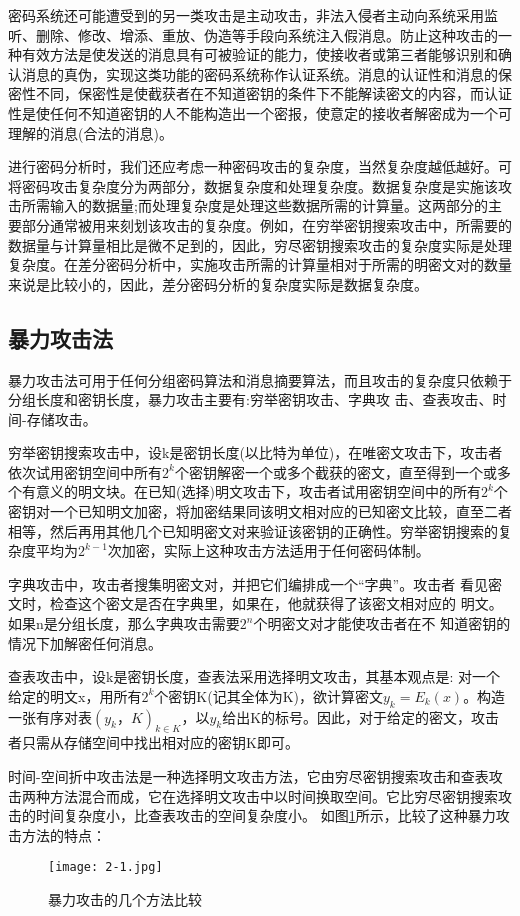 密码系统还可能遭受到的另一类攻击是主动攻击，非法入侵者主动向系统采用监听、删除、修改、增添、重放、伪造等手段向系统注入假消息。防止这种攻击的一种有效方法是使发送的消息具有可被验证的能力，使接收者或第三者能够识别和确认消息的真伪，实现这类功能的密码系统称作认证系统。消息的认证性和消息的保密性不同，保密性是使截获者在不知道密钥的条件下不能解读密文的内容，而认证性是使任何不知道密钥的人不能构造出一个密报，使意定的接收者解密成为一个可理解的消息(合法的消息)。

进行密码分析时，我们还应考虑一种密码攻击的复杂度，当然复杂度越低越好。可将密码攻击复杂度分为两部分，数据复杂度和处理复杂度。数据复杂度是实施该攻击所需输入的数据量;而处理复杂度是处理这些数据所需的计算量。这两部分的主要部分通常被用来刻划该攻击的复杂度。例如，在穷举密钥搜索攻击中，所需要的数据量与计算量相比是微不足到的，因此，穷尽密钥搜索攻击的复杂度实际是处理复杂度。在差分密码分析中，实施攻击所需的计算量相对于所需的明密文对的数量来说是比较小的，因此，差分密码分析的复杂度实际是数据复杂度。
\subsection{暴力攻击法}
暴力攻击法可用于任何分组密码算法和消息摘要算法，而且攻击的复杂度只依赖于分组长度和密钥长度，暴力攻击主要有:穷举密钥攻击、字典攻
击、查表攻击、时间-存储攻击。

穷举密钥搜索攻击中，设k是密钥长度(以比特为单位)，在唯密文攻击下，攻击者依次试用密钥空间中所有$2^k$个密钥解密一个或多个截获的密文，直至得到一个或多个有意义的明文块。在已知(选择)明文攻击下，攻击者试用密钥空间中的所有$2^k$个密钥对一个已知明文加密，将加密结果同该明文相对应的已知密文比较，直至二者相等，然后再用其他几个已知明密文对来验证该密钥的正确性。穷举密钥搜索的复杂度平均为$2^{k-1}$次加密，实际上这种攻击方法适用于任何密码体制。

字典攻击中，攻击者搜集明密文对，并把它们编排成一个“字典”。攻击者
看见密文时，检查这个密文是否在字典里，如果在，他就获得了该密文相对应的
明文。如果n是分组长度，那么字典攻击需要$2^n$个明密文对才能使攻击者在不
知道密钥的情况下加解密任何消息。

查表攻击中，设k是密钥长度，查表法采用选择明文攻击，其基本观点是:
对一个给定的明文x，用所有$2^k$个密钥K(记其全体为K)，欲计算密文$y_k=E_k(x)$。构造一张有序对表${(y_k，K)}_{k\in K}$，以$y_k$给出K的标号。因此，对于给定的密文，攻击者只需从存储空间中找出相对应的密钥K即可。

时间-空间折中攻击法是一种选择明文攻击方法，它由穷尽密钥搜索攻击和查表攻击两种方法混合而成，它在选择明文攻击中以时间换取空间。它比穷尽密钥搜索攻击的时间复杂度小，比查表攻击的空间复杂度小。
如图\ref{fig:2.1}所示，比较了这种暴力攻击方法的特点：
\begin{figure}[!ht]
\centering
\texttt{[image: 2-1.jpg]}
\caption{暴力攻击的几个方法比较}
\label{fig:2.1}
\end{figure}
